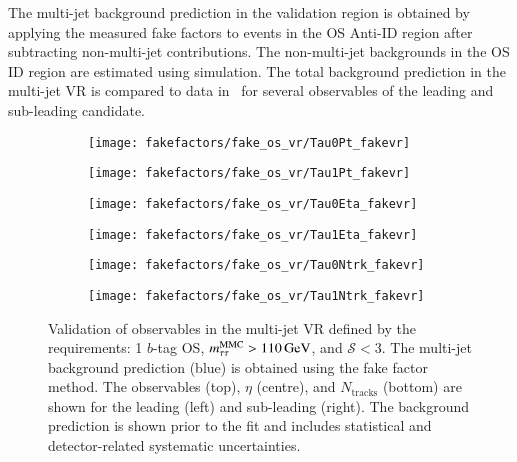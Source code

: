 The multi-jet background prediction in the validation region is
obtained by applying the measured fake factors to events in the OS
Anti-ID region after subtracting non-multi-jet contributions. The
non-multi-jet backgrounds in the OS ID region are estimated using
simulation. The total background prediction in the multi-jet VR is
compared to data in~ for several
observables of the leading and sub-leading \tauhadvis candidate.

\begin{figure}[htbp]
  \centering

  \begin{subfigure}{0.45\textwidth}
    \texttt{[image: fakefactors/fake\_os\_vr/Tau0Pt\_fakevr]}
  \end{subfigure}\hspace*{0.04\textwidth}%
  \begin{subfigure}{0.45\textwidth}
    \texttt{[image: fakefactors/fake\_os\_vr/Tau1Pt\_fakevr]}
  \end{subfigure}

  \begin{subfigure}{0.45\textwidth}
    \texttt{[image: fakefactors/fake\_os\_vr/Tau0Eta\_fakevr]}
  \end{subfigure}\hspace*{0.04\textwidth}%
  \begin{subfigure}{0.45\textwidth}
    \texttt{[image: fakefactors/fake\_os\_vr/Tau1Eta\_fakevr]}
  \end{subfigure}

  \begin{subfigure}{0.45\textwidth}
    \texttt{[image: fakefactors/fake\_os\_vr/Tau0Ntrk\_fakevr]}
  \end{subfigure}\hspace*{0.04\textwidth}%
  \begin{subfigure}{0.45\textwidth}
    \texttt{[image: fakefactors/fake\_os\_vr/Tau1Ntrk\_fakevr]}
  \end{subfigure}

  \caption{Validation of \tauhadvis observables in the multi-jet VR
    defined by the requirements: 1 $b$-tag OS,
    $m_{\tau\tau}^\text{MMC} > \SI{110}{\ensuremath{\text{GeV}}}$, and $\mathcal{S} < 3$. The multi-jet
    background prediction (blue) is obtained using the fake factor
    method. The \tauhadvis observables \pT (top), $\eta$ (centre), and
    $N_{\text{tracks}}$ (bottom) are shown for the leading (left) and
    sub-leading \tauhadvis (right). The background prediction is shown
    prior to the fit and includes statistical and detector-related
    systematic uncertainties.}%
  \label{fig:fake_factor_OSVR_kinematics}%
\end{figure}

